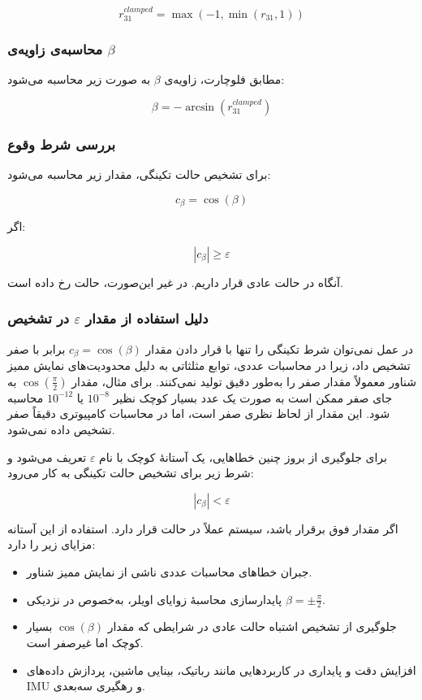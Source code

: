 \documentclass{article}
\begin{document}
\[
r_{31}^{clamped} = \max(-1, \min(r_{31}, 1))
\]

\subsubsection{محاسبه‌ی زاویه‌ی \texorpdfstring{$\beta$}{beta}}

مطابق فلوچارت، زاویه‌ی $\beta$ به صورت زیر محاسبه می‌شود:

\[
\beta = -\arcsin(r_{31}^{clamped})
\]

\subsubsection{بررسی شرط وقوع }

برای تشخیص حالت تکینگی، مقدار زیر محاسبه می‌شود:

\[
c_\beta = \cos(\beta)
\]

اگر:

\[
|c_\beta| \ge \varepsilon
\]

آنگاه در حالت عادی قرار داریم. در غیر این‌صورت، حالت  رخ داده است.
\subsubsection{دلیل استفاده از مقدار \texorpdfstring{$\varepsilon$}{epsilon} در تشخیص }

در عمل نمی‌توان شرط تکینگی را تنها با قرار دادن مقدار
$c_\beta = \cos(\beta)$
برابر با صفر تشخیص داد، زیرا در محاسبات عددی، توابع مثلثاتی به دلیل محدودیت‌های نمایش ممیز شناور معمولاً مقدار صفر را به‌‌طور دقیق تولید نمی‌کنند. برای مثال، مقدار
$\cos(\frac{\pi}{2})$
به جای صفر ممکن است به صورت یک عدد بسیار کوچک نظیر
$10^{-8}$
یا
$10^{-12}$
محاسبه شود. این مقدار از لحاظ نظری صفر است، اما در محاسبات کامپیوتری دقیقاً صفر تشخیص داده نمی‌شود.

برای جلوگیری از بروز چنین خطاهایی، یک آستانهٔ کوچک با نام
$\varepsilon$
تعریف می‌شود و شرط زیر برای تشخیص حالت تکینگی به کار می‌رود:

\[
|c_\beta| < \varepsilon
\]

اگر مقدار فوق برقرار باشد، سیستم عملاً در حالت  قرار دارد. استفاده از این آستانه مزایای زیر را دارد:

\begin{itemize}
	\item جبران خطاهای محاسبات عددی ناشی از نمایش ممیز شناور.
	\item پایدارسازی محاسبهٔ زوایای اویلر، به‌خصوص در نزدیکی $\beta = \pm \frac{\pi}{2}$.
	\item جلوگیری از تشخیص اشتباه حالت عادی در شرایطی که مقدار $\cos(\beta)$ بسیار کوچک اما غیرصفر است.
	\item افزایش دقت و پایداری در کاربردهایی مانند رباتیک، بینایی ماشین، پردازش داده‌های IMU و رهگیری سه‌بعدی.
\end{itemize}
\end{document}
